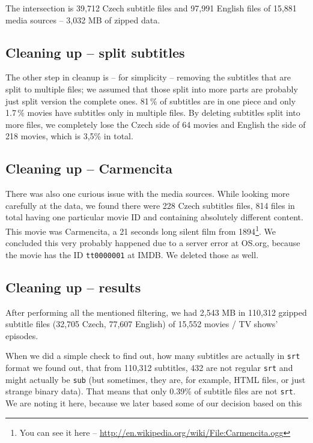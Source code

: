 The intersection is 39,712 Czech subtitle files and 97,991 English files of 15,881 media sources -- 3,032 MB of zipped data.

\subsection*{Cleaning up -- split subtitles}
The other step in cleanup is -- for simplicity -- removing the subtitles that are split to multiple files; we assumed that those split into more parts are probably just split version the complete ones. 81\,\% of subtitles are in one piece and only 1.7\,\% movies have subtitles only in multiple files. By deleting subtitles split into more files, we completely lose the Czech side of 64 movies and English the side of 218 movies, which is 3,5\% in total.

\subsection*{Cleaning up -- Carmencita}
There was also one curious issue with the media sources. While looking more carefully at the data, we found there were 228 Czech subtitles files, 814 files in total having one particular movie ID and containing absolutely different content. This movie was Carmencita, a 21 seconds long silent film from 1894\footnote{You can see it here -- \url{http://en.wikipedia.org/wiki/File:Carmencita.ogg}}. We concluded this very probably happened due to a server error at OS.org, because the movie has the ID {\tt tt0000001} at IMDB. We deleted those as well.


\subsection*{Cleaning up -- results}
After performing all the mentioned filtering, we had 2,543 MB in 110,312 gzipped subtitle files (32,705 Czech, 77,607 English) of 15,552 movies / TV shows' episodes.

When we did a simple check to find out, how many subtitles are actually in \texttt{srt} format we found out, that from 110,312 subtitles, 432 are not regular \texttt{srt} and might actually be \texttt{sub} (but sometimes, they are, for example, HTML files, or just strange binary data). That means that only 0.39\% of subtitle files are not \texttt{srt}. We are noting it here, because we later based some of our decision based on this

